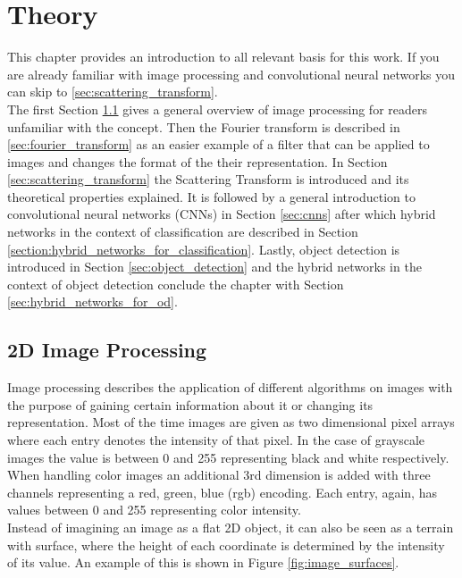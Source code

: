\chapter{Theory}
\label{chap:theory}

This chapter provides an introduction to all relevant basis for this work. If you are already familiar with image processing and convolutional neural networks you can skip to \ref{sec:scattering_transform}. \\
The first Section \ref{sec:2D_image_processing} gives a general overview of image processing for readers unfamiliar with the concept. Then the Fourier transform is described in \ref{sec:fourier_transform} as an easier example of a filter that can be applied to images and changes the format of the their representation. In Section \ref{sec:scattering_transform} the Scattering Transform is introduced and its theoretical properties explained. It is followed by a general introduction to convolutional neural networks (CNNs) in Section \ref{sec:cnns} after which hybrid networks in the context of classification are described in Section \ref{section:hybrid_networks_for_classification}. Lastly, object detection is introduced in Section \ref{sec:object_detection} and the hybrid networks in the context of object detection conclude the chapter with Section \ref{sec:hybrid_networks_for_od}. 

\section{2D Image Processing}
\label{sec:2D_image_processing}

Image processing describes the application of different algorithms on images with the purpose of gaining certain information about it or changing its representation. Most of the time images are given as two dimensional pixel arrays where each entry denotes the intensity of that pixel. In the case of grayscale images the value is between 0 and 255 representing black and white respectively. When handling color images an additional 3rd dimension is added with three channels representing a red, green, blue (rgb) encoding. Each entry, again, has values between 0 and 255 representing color intensity. \\
Instead of imagining an image as a flat 2D object, it can also be seen as a terrain with surface, where the height of each coordinate is determined by the intensity of its value. An example of this is shown in Figure \ref{fig:image_surfaces}. 



